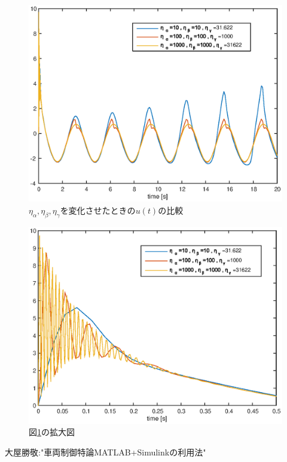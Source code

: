 \documentclass[a4paper,12pt]{jarticle}
\begin{document}
\begin{figure}[tb]
    \begin{center}
	 \includegraphics[width=140mm]{fig/eta_hikaku.eps}
        \caption{$\eta_\alpha,\eta_\beta,\eta_\gamma$を変化させたときの$u(t)$の比較}
        \label{fig:eta_hikaku}
    \end{center}
\end{figure}
%
%
\begin{figure}[tb]
    \begin{center}
	 \includegraphics[width=140mm]{fig/eta_hikaku_k.eps}
        \caption{図\ref{fig:eta_hikaku}の拡大図}
        \label{fig:eta_hikaku_k}
    \end{center}
\end{figure}
%
%
%
%
\newpage
\begin{thebibliography}{99}

  大屋勝敬:"車両制御特論MATLAB+Simulinkの利用法"
\end{thebibliography}
\end{document}
